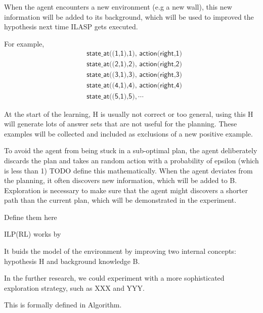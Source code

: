 When the agent encounters a new environment (e.g a new wall), this new information will be added to its background, which will be used to improved the hypothesis 
next time ILASP gets executed. 

For example, 
\begin{equation*}
\begin{split}
&\textsf{state\_at((1,1),1), action(right,1)}\\
&\textsf{state\_at((2,1),2), action(right,2)}\\
&\textsf{state\_at((3,1),3), action(right,3)}\\
&\textsf{state\_at((4,1),4), action(right,4)}\\
&\textsf{state\_at((5,1),5)}, \cdots
\end{split}
\end{equation*}

At the start of the learning, H is usually not correct or too general, using this H will generate lots of answer sets that are not useful for the planning. 
These examples will be collected and included as exclusions of a new positive example. 


To avoid the agent from being stuck in a sub-optimal plan, the agent deliberately discards the plan and takes an random action with a probability of 
epsilon (which is less than 1) TODO define this mathematically. 
When the agent deviates from the planning, it often discovers new information, which will be added to B.
Exploration is necessary to make sure that the agent might discovers a shorter path than the current plan, which will be demonstrated in the experiment. 

Define them here

ILP(RL) works by 

It buids the model of the environment by improving two internal concepts: hypothesis H and background knowledge B. 

In the further research, we could experiment with a more sophisticated exploration strategy, such as XXX and YYY. 

This is formally defined in Algorithm. 

